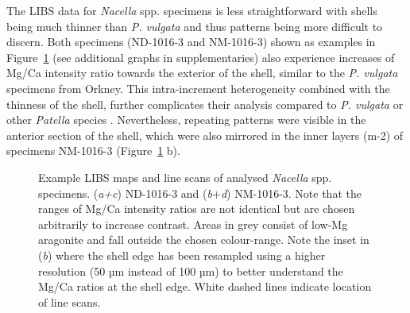 \documentclass[
  authoryear,
  preprint,
  3p]{elsarticle}
\begin{document}
The LIBS data for \emph{Nacella} spp. specimens is less straightforward
with shells being much thinner than \emph{P. vulgata} and thus patterns
being more difficult to discern. Both specimens (ND-1016-3 and
NM-1016-3) shown as examples in Figure~\ref{fig-Nac_LIBS} (see
additional graphs in supplementaries) also experience increases of Mg/Ca
intensity ratio towards the exterior of the shell, similar to the
\emph{P. vulgata} specimens from Orkney. This intra-increment
heterogeneity combined with the thinness of the shell, further
complicates their analysis compared to \emph{P. vulgata} or other
\emph{Patella} species \citep{Hausmann2019-fi}. Nevertheless, repeating
patterns were visible in the anterior section of the shell, which were
also mirrored in the inner layers (m-2) of specimens NM-1016-3
(Figure~\ref{fig-Nac_LIBS} b).

\begin{figure}[H]


\caption{\label{fig-Nac_LIBS}Example LIBS maps and line scans of
analysed \emph{Nacella} spp. specimens. (\emph{a+c}) ND-1016-3 and
(\emph{b}+\emph{d}) NM-1016-3. Note that the ranges of Mg/Ca intensity
ratios are not identical but are chosen arbitrarily to increase
contrast. Areas in grey consist of low-Mg aragonite and fall outside the
chosen colour-range. Note the inset in (\emph{b}) where the shell edge
has been resampled using a higher resolution (50 µm instead of 100 µm)
to better understand the Mg/Ca ratios at the shell edge. White dashed
lines indicate location of line scans.}

\end{figure}%
\end{document}
